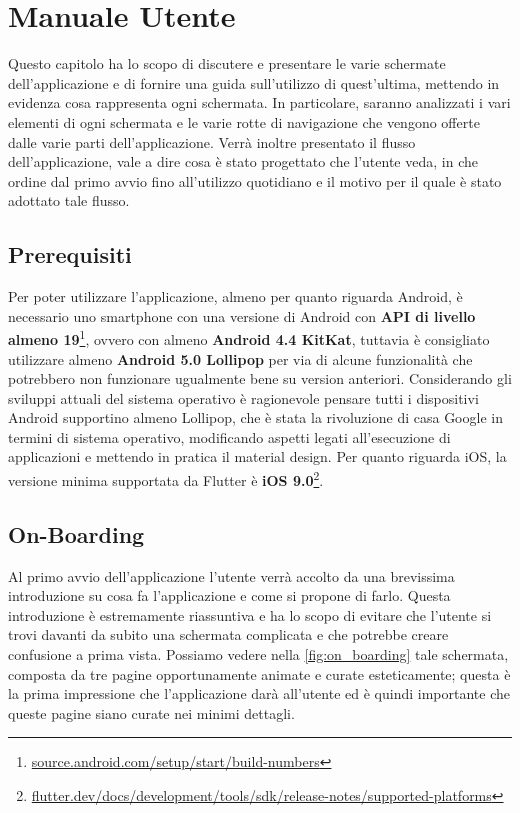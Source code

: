 \chapter{Manuale Utente}
\label{chap:manuale_utente}
Questo capitolo ha lo scopo di discutere e presentare le varie schermate dell'applicazione e di fornire una guida sull'utilizzo di quest'ultima, mettendo in evidenza cosa rappresenta ogni schermata. In particolare, saranno analizzati i vari elementi di ogni schermata e le varie rotte di navigazione che vengono offerte dalle varie parti dell'applicazione. Verrà inoltre presentato il flusso dell'applicazione, vale a dire cosa è stato progettato che l'utente veda, in che ordine dal primo avvio fino all'utilizzo quotidiano e il motivo per il quale è stato adottato tale flusso.

\section{Prerequisiti}
Per poter utilizzare l'applicazione, almeno per quanto riguarda Android, è necessario uno smartphone con una versione di Android con \textbf{API di livello almeno 19}\footnote{\url{source.android.com/setup/start/build-numbers}}, ovvero con almeno \textbf{Android 4.4 KitKat}, tuttavia è consigliato utilizzare almeno \textbf{Android 5.0 Lollipop} per via di alcune funzionalità che potrebbero non funzionare ugualmente bene su version anteriori. Considerando gli sviluppi attuali del sistema operativo è ragionevole pensare tutti i dispositivi Android supportino almeno Lollipop, che è stata la rivoluzione di casa Google in termini di sistema operativo, modificando aspetti legati all'esecuzione di applicazioni e mettendo in pratica il material design. Per quanto riguarda iOS, la versione minima supportata da Flutter è \textbf{iOS 9.0}\footnote{\url{flutter.dev/docs/development/tools/sdk/release-notes/supported-platforms}}.

\newpage
\section{On-Boarding}
Al primo avvio dell'applicazione l'utente verrà accolto da una brevissima introduzione su cosa fa l'applicazione e come si propone di farlo. Questa introduzione è estremamente riassuntiva e ha lo scopo di evitare che l'utente si trovi davanti da subito una schermata complicata e che potrebbe creare confusione a prima vista. Possiamo vedere nella \autoref{fig:on_boarding} tale schermata, composta da tre pagine opportunamente animate e curate esteticamente; questa è la prima impressione che l'applicazione darà all'utente ed è quindi importante che queste pagine siano curate nei minimi dettagli.

